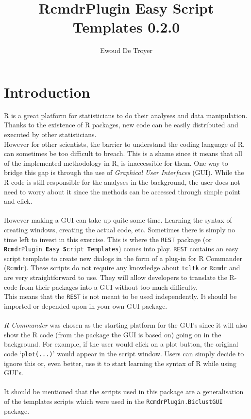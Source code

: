 \documentclass[a4paper]{article}\usepackage[]{graphicx}\usepackage[]{color}
\title{RcmdrPlugin Easy Script Templates 0.2.0}
\author{Ewoud De Troyer}
\date{}
\begin{document}
\maketitle
\tableofcontents
\newpage
\section{Introduction}
R is a great platform for statisticians to do their analyses and data
manipulation. Thanks to the existence of R packages, new code can be easily
distributed and executed by other statisticians.\\
However for other scientists, the barrier to understand the coding language of
R, can sometimes be too difficult to breach. This is a shame since it means that
all of the implemented methodology in R, is inaccessible for them. One way to
bridge this gap is through the use of {\it Graphical User Interfaces} (GUI). While the R-code is
still responsible for the analyses in the background, the user does not need to
worry about it since the methods can be accessed through simple point and click.
\\ \\
However making a GUI can take up quite some time. Learning the syntax of
creating windows, creating the actual code, etc. Sometimes there is simply no
time left to invest in this exercise. This is where the \texttt{REST} package (or
\texttt{{\bf R}cmdrPlugin {\bf E}asy {\bf S}cript {\bf T}emplates}) comes into
play. \texttt{REST} contains an easy script template to create new dialogs in
the form of a plug-in for R Commander (\texttt{Rcmdr}). These scripts do not
require any knowledge about \texttt{tcltk} or \texttt{Rcmdr} and are very
straightforward to use. They will allow developers to translate the R-code from
their packages into a GUI without too much difficulty.\\
This means that the \texttt{REST} is not meant to be used independently. It
should be imported or depended upon in your own GUI package.
\\ \\
{\it R Commander} was chosen as the starting platform for the GUI's since it
will also show the R code (from the package the GUI is based on) going on in the
background. For example, if the user would click on a plot button, the original
code `\texttt{plot(...)}' would appear in the script window. Users can simply
decide to ignore this or, even better, use it to start learning the syntax of R
while using GUI's.
\\ \\
It should be mentioned that the scripts used in this package are a
generalisation of the templates scripts which were used in the
\texttt{RcmdrPlugin.BiclustGUI} package.
\end{document}
